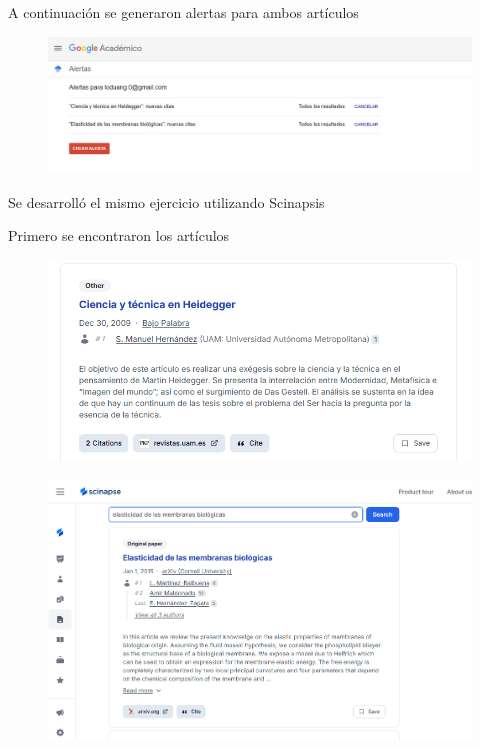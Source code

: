 \documentclass[12pt]{exam}
\begin{document}
A continuación se generaron alertas para ambos artículos
\begin{figure}[H]
    \centering
    \includegraphics[width=0.8\linewidth]{crear alerta.png}
    \label{}
\end{figure}

Se desarrolló el mismo ejercicio utilizando Scinapsis

Primero se encontraron los artículos
\begin{figure}[H]
    \centering
    \includegraphics[width=0.8\linewidth]{scinapsis.png}
    \label{}
\end{figure}
\begin{figure}[H]
    \centering
    \includegraphics[width=0.8\linewidth]{scinapse bio.png}
    \label{}
\end{figure}
\end{document}

